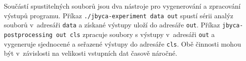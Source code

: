Součástí spustitelných souborů jsou dva nástroje pro vygenerování a zpracování výstupů programu. Příkaz \texttt{./jbyca-experiment data out} spustí sérii analýz souborů v~adresáři \texttt{data} a získané výstupy uloží do adresáře \texttt{out}. Příkaz \texttt{jbyca-postprocessing out cls} zpracuje soubory s výstupy v~adresáři \texttt{out} a vygeneruje sjednocené a seřazené výstupy do adresáře \texttt{cls}. Obě činnosti mohou být v~závislosti na velikosti vstupních dat časově náročné.







